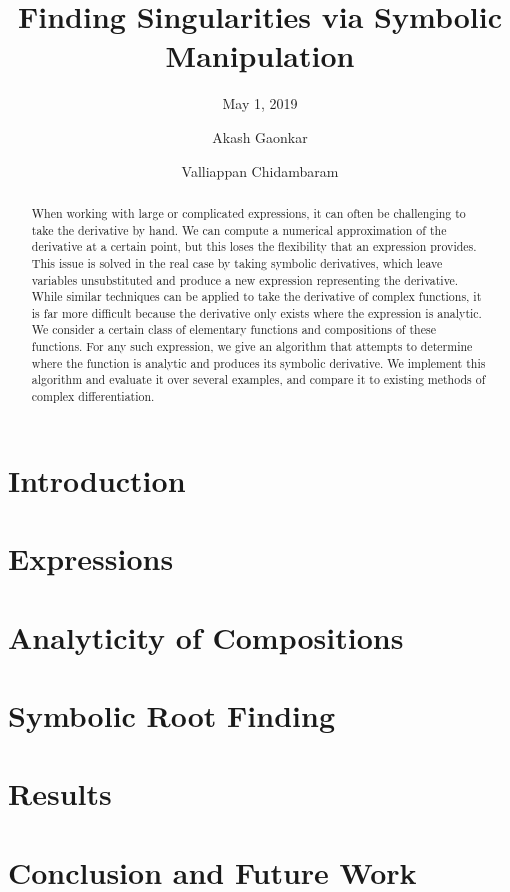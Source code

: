 \documentclass[sigplan]{acmart}
\title{Finding Singularities via Symbolic Manipulation}
\subtitle{May 1, 2019}
\author{Akash Gaonkar}
\affiliation{Undergraduate Student, \institution{University of Colorado at Boulder}}
\author{Valliappan Chidambaram}
\affiliation{Undergraduate Student, \institution{University of Colorado at Boulder}}
\theoremstyle{definition}
\begin{document}
  \begin{abstract}
		When working with large or complicated expressions, it can often be challenging to take the derivative by hand. We can compute a numerical approximation of the derivative at a certain point, but this loses the flexibility that an expression provides. This issue is solved in the real case by taking symbolic derivatives, which leave variables unsubstituted and produce a new expression representing the derivative. While similar techniques can be applied to take the derivative of complex functions, it is far more difficult because the derivative only exists where the expression is analytic. We consider a certain class of elementary functions and compositions of these functions. For any such expression, we give an algorithm that attempts to determine where the function is analytic and produces its symbolic derivative. We implement this algorithm and evaluate it over several examples, and compare it to existing methods of complex differentiation.
  \end{abstract}

  \maketitle

  \section{Introduction}
  \label{sec:introduction}
  

  \section{Expressions}
  \label{sec:expressions}
  

  \section{Analyticity of Compositions}
  \label{sec:analyticity}
  

  \section{Symbolic Root Finding}
  \label{sec:rootfinding}
  

  \section{Results}
  \label{sec:results}
  

  \section{Conclusion and Future Work}
  \label{sec:conclusion}
  

  \nocite{*}
  
  
\end{document}
